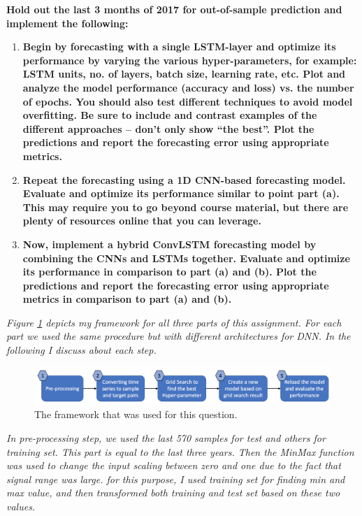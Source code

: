 \item \textbf{Hold out the last 3 months of 2017 for out-of-sample prediction and implement the following:} 
\begin{enumerate}
\item \textbf{Begin by forecasting with a single LSTM-layer and optimize its performance by varying the various hyper-parameters, for example: LSTM units, no. of layers, batch  size, learning  rate, etc. Plot and analyze the model performance (accuracy and loss) vs. the number of epochs. You should also test different  techniques to avoid model overfitting. Be sure to include and  contrast examples of the different approaches – don’t only show “the best”. Plot the predictions and report the forecasting error using appropriate metrics.}
\item \textbf{Repeat the forecasting using a 1D CNN-based  forecasting model. Evaluate and optimize its performance similar to point part (a). This may require you to go beyond course material, but there are plenty of resources online that you can leverage.}
\item \textbf{Now, implement a hybrid ConvLSTM forecasting model by combining the CNNs and LSTMs together. Evaluate and optimize its performance in comparison to part (a) and (b). Plot the predictions and report the forecasting error using appropriate metrics in comparison to part (a) and (b).}
\end{enumerate}

\textit{Figure \ref{fig:ass4_frameworks} depicts my framework for all three parts of this assignment. For each part we used the same procedure but with different architectures for DNN. In the following I discuss about each step.  }

\begin{figure}[H]
    \centering
    \begin{minipage}[b]{1.1\textwidth}
        \includegraphics[width=\textwidth]{manuscript/src/figures/Ass4/Ass4_frameworks.png}
    \end{minipage}
    \caption{The framework that was used for this question.}
    \label{fig:ass4_frameworks}
\end{figure}


\textit{In pre-processing step, we used the last 570 samples for test and others for training set. This part is equal to the last three years. Then the MinMax function was used to change the input scaling between zero and one due to the fact that signal range was large. for this purpose, I used training set for finding min and max value, and then transformed both training and test set based on these two values. }


